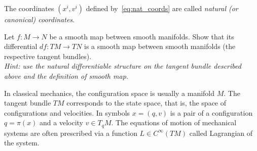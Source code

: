 The coordinates $(x^i, v^i)$ defined by~\eqref{eq:nat_coords} are called \emph{natural (or canonical) coordinates}.

\begin{exercise}
  Let $f:M\to N$ be a smooth map between smooth manifolds.
  Show that its differential $df: TM \to TN$ is a smooth map between smooth manifolds (the respective tangent bundles).\\
  \textit{\small Hint: use the natural differentiable structure on the tangent bundle described above and the definition of smooth map.}
\end{exercise}

\begin{remark}
  In classical mechanics, the configuration space is usually a manifold $M$.
  The tangent bundle $TM$ corresponds to the state space, that is, the space of configurations and velocities. In symbols $x=(q,v)$ is a pair of a configuration $q = \pi(x)$ and a velocity $v\in T_q M$.
  The equations of motion of mechanical systems are often prescribed via a function $L\in C^\infty(TM)$ called Lagrangian of the system.
\end{remark}
